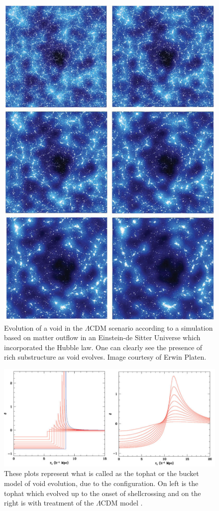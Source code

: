 \documentclass[fleqn,usenatbib]{mnras}
\begin{document}
\begin{figure}
	\centering
	\includegraphics[scale = 0.6]{void_evol}
	\caption{Evolution of a void in the $ \Lambda$CDM scenario according to a simulation based on matter outflow in an Einstein-de Sitter Universe which incorporated the Hubble law. One can clearly see the presence of rich substructure as void evolves. Image courtesy of Erwin Platen.}
	\label{fig:voidevol}
\end{figure}
\begin{figure}
	\centering
	\includegraphics[scale = 0.35]{tophat}
	\caption{These plots represent what is called as the tophat or the bucket model of void evolution, due to the configuration. On left is the tophat which evolved up to the onset of shellcrossing and on the right is with treatment of the $ \Lambda$CDM model \citep{van_de_weygaert_voids_2014}.}
	\label{fig:tophat}
\end{figure}
\end{document}

